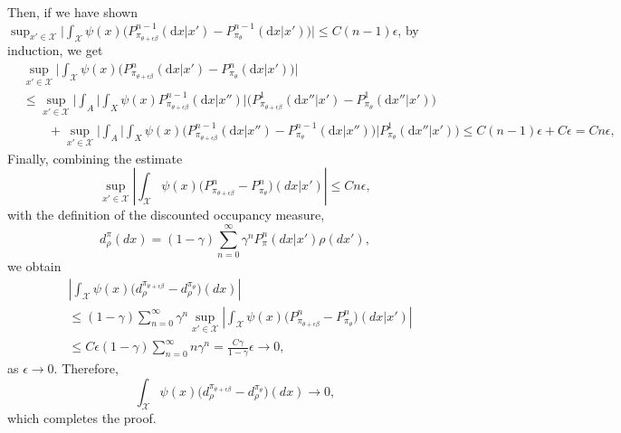 \documentclass{article}
\newcommand{\1}{\mathbbm{1}}
\numberwithin{equation}{section}
\def\to{\rightarrow}
\def\d{{\mathrm{d}}}
\begin{document}
Then, if we have shown $\sup_{x'\in\mathcal{X}}\big|\int_{\mathcal{X}}\psi(x)\big(P_{\pi_{\theta+\epsilon\beta}}^{n-1}(\d x|x')-P_{\pi_\theta}^{n-1}(\d x|x')\big)\big|\leq C(n-1)\epsilon$, by induction, we get
\begin{align*}
&\sup_{x'\in\mathcal{X}}\bigg|\int_{\mathcal{X}}\psi(x)\big(P_{\pi_{\theta+\epsilon\beta}}^n(\d x|x')-P_{\pi_\theta}^n(\d x|x')\big)\bigg|
\\
&\leq \sup_{x'\in\mathcal{X}}\bigg|\int_A\bigg|\int_X\psi(x)P^{n-1}_{\pi_{\theta+\epsilon\beta}}(\d x|x'')\bigg|\big(P^1_{\pi_{\theta+\epsilon\beta}}(\d x''|x')-P^1_{\pi_{\theta}}(\d x''|x')\big)
\\
&\qquad+\sup_{x'\in\mathcal{X}}\bigg|\int_A\bigg|\int_X\psi(x)\big(P^{n-1}_{\pi_{\theta+\epsilon\beta}}(\d x|x'')-P^{n-1}_{\pi_{\theta}}(\d x|x'')\big)\bigg|P^1_{\pi_{\theta}}(\d x''|x')\big)\leq C(n-1)\epsilon+C\epsilon=Cn\epsilon, 
\end{align*}
Finally, combining the estimate
\[
\sup_{x'\in\mathcal X}
\left|
\int_{\mathcal X}
\psi(x)
\big(
P_{\pi_{\theta+\epsilon\beta}}^n
-
P_{\pi_\theta}^n
\big)(dx|x')
\right|
\le Cn\epsilon,
\]
with the definition of the discounted occupancy measure,
\[
d_\rho^\pi(dx)
=
(1-\gamma)
\sum_{n=0}^{\infty}
\gamma^n
P_\pi^n(dx|x')\rho(dx'),
\]
we obtain
\begin{align*}
&\left|
\int_{\mathcal X}
\psi(x)
\big(
d_\rho^{\pi_{\theta+\epsilon\beta}}
-
d_\rho^{\pi_\theta}
\big)(dx)
\right|
\\
&\le
(1-\gamma)
\sum_{n=0}^{\infty}
\gamma^n
\sup_{x'\in\mathcal X}
\left|
\int_{\mathcal X}
\psi(x)
\big(
P_{\pi_{\theta+\epsilon\beta}}^n
-
P_{\pi_\theta}^n
\big)(dx|x')
\right|
\\
&\le
C\epsilon(1-\gamma)
\sum_{n=0}^{\infty}
n\gamma^n
=
\frac{C\gamma}{1-\gamma}\epsilon
\longrightarrow 0,
\end{align*}
as $\epsilon\to0$. Therefore,
\[
\int_{\mathcal X}
\psi(x)
\big(
d_\rho^{\pi_{\theta+\epsilon\beta}}
-
d_\rho^{\pi_\theta}
\big)(dx)
\longrightarrow 0,
\]
which completes the proof.
\end{document}
